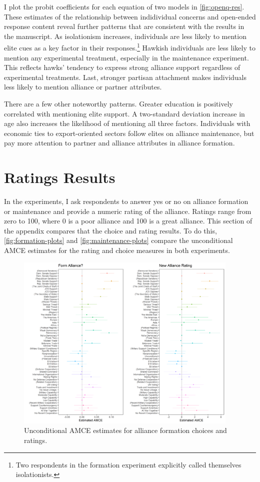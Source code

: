 \documentclass[12pt]{article}
\begin{document}
I plot the probit coefficients for each equation of two models in \autoref{fig:openq-res}. 
These estimates of the relationship between indidividual concerns and open-ended response content reveal further patterns that are consistent with the results in the manuscript.
As isolationism increases, individuals are less likely to mention elite cues as a key factor in their responses.\footnote{Two respondents in the formation experiment explicitly called themselves isolationists.} 
Hawkish individuals are less likely to mention any experimental treatment, especially in the maintenance experiment.
This reflects hawks' tendency to express strong alliance support regardless of experimental treatments.  
Last, stronger partisan attachment makes individuals less likely to mention alliance or partner attributes. 


There are a few other noteworthy patterns.
Greater education is positively correlated with mentioning elite support. 
A two-standard deviation increase in age also increases the likelihood of mentioning all three factors. 
Individuals with economic ties to export-oriented sectors follow elites on alliance maintenance, but pay more attention to partner and alliance attributes in alliance formation. 


\newpage


\section{Ratings Results}

In the experiments, I ask respondents to answer yes or no on alliance formation or maintenance and provide a numeric rating of the alliance. 
Ratings range from zero to 100, where 0 is a poor alliance and 100 is a great alliance. 
This section of the appendix compares that the choice and rating results. 
To do this, \autoref{fig:formation-plots} and \autoref{fig:maintenance-plots} compare the unconditional AMCE estimates for the rating and choice measures in both experiments.  


\begin{figure}
	\centering
		\includegraphics[width=0.95\textwidth]{formation-plots.png}
	\caption{Unconditional AMCE estimates for alliance formation choices and ratings.}
	\label{fig:formation-plots}
\end{figure}
\end{document}
